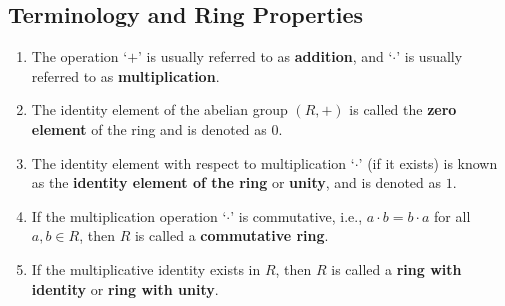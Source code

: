 \subsection{Terminology and Ring Properties}

\begin{enumerate}
    \item The operation `$+$' is usually referred to as \textbf{addition}, and `$\cdot$' is usually referred to as \textbf{multiplication}.
    
    \item The identity element of the abelian group $(R, +)$ is called the \textbf{zero element} of the ring and is denoted as $0$.
    
    \item The identity element with respect to multiplication `$\cdot$' (if it exists) is known as the \textbf{identity element of the ring} or \textbf{unity}, and is denoted as $1$.
    
    \item If the multiplication operation `$\cdot$' is commutative, i.e., $a \cdot b = b \cdot a$ for all $a, b \in R$, then $R$ is called a \textbf{commutative ring}.
    
    \item If the multiplicative identity exists in $R$, then $R$ is called a \textbf{ring with identity} or \textbf{ring with unity}.
\end{enumerate}
